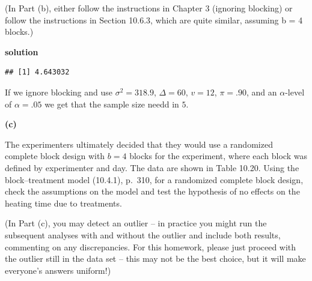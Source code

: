 \documentclass[12pt,]{article}
\newenvironment{Shaded}{\begin{snugshade}}{\end{snugshade}}
\newcommand{\KeywordTok}[1]{\textcolor[rgb]{0.13,0.29,0.53}{\textbf{#1}}}
\newcommand{\DataTypeTok}[1]{\textcolor[rgb]{0.13,0.29,0.53}{#1}}
\newcommand{\DecValTok}[1]{\textcolor[rgb]{0.00,0.00,0.81}{#1}}
\newcommand{\FloatTok}[1]{\textcolor[rgb]{0.00,0.00,0.81}{#1}}
\newcommand{\StringTok}[1]{\textcolor[rgb]{0.31,0.60,0.02}{#1}}
\newcommand{\OtherTok}[1]{\textcolor[rgb]{0.56,0.35,0.01}{#1}}
\newcommand{\ControlFlowTok}[1]{\textcolor[rgb]{0.13,0.29,0.53}{\textbf{#1}}}
\newcommand{\OperatorTok}[1]{\textcolor[rgb]{0.81,0.36,0.00}{\textbf{#1}}}
\newcommand{\NormalTok}[1]{#1}
\begin{document}
(In Part (b), either follow the instructions in Chapter 3 (ignoring
blocking) or follow the instructions in Section 10.6.3, which are quite
similar, assuming b = 4 blocks.)

\textbf{solution}

\begin{Shaded}
\end{Shaded}

\begin{verbatim}
## [1] 4.643032
\end{verbatim}

If we ignore blocking and use \(\sigma^2 = 318.9\), \(\Delta = 60\),
\(v=12\), \(\pi = .90\), and an \(\alpha\)-level of \(\alpha =.05\) we
get that the sample size needd in \(5\).

\textbf{(c)}

The experimenters ultimately decided that they would use a randomized
complete block design with \(b = 4\) blocks for the experiment, where
each block was defined by experimenter and day. The data are shown in
Table 10.20. Using the block--treatment model (10.4.1), p.~310, for a
randomized complete block design, check the assumptions on the model and
test the hypothesis of no effects on the heating time due to treatments.

(In Part (c), you may detect an outlier -- in practice you might run the
subsequent analyses with and without the outlier and include both
results, commenting on any discrepancies. For this homework, please just
proceed with the outlier still in the data set -- this may not be the
best choice, but it will make everyone's answers uniform!)
\end{document}
